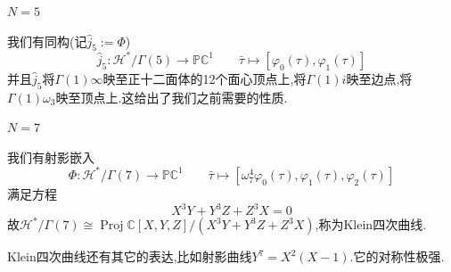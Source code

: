 \documentclass[pdf]{beamer}
\numberwithin{equation}{section}
\theoremstyle{plain}
\theoremstyle{plain}
\theoremstyle{remark}
\DeclareMathOperator{\Proj}{\operatorname{Proj}}
\begin{document}
\begin{frame}{$N=5$}

	我们有同构(记$\hat{j}_5:=\varPhi$)
	$$\hat{j}_5: \mathcal{H}^*/\Gamma(5) \longrightarrow \mathbb{PC}^{1} \qquad \bar{\tau} \longmapsto \left[ \varphi_0(\tau),\varphi_{1}(\tau) \right]$$
并且$\hat{j}_5$将$\Gamma(1)\infty$映至正十二面体的12个面心顶点上,将$\Gamma(1)i$映至边点,将$\Gamma(1)\omega_3$映至顶点上.这给出了我们之前需要的性质.
\end{frame}
\begin{frame}{$N=7$}

	我们有射影嵌入
	$$\varPhi: \mathcal{H}^*/\Gamma(7) \longrightarrow \mathbb{PC}^{1} \qquad \bar{\tau} \longmapsto \left[ \omega_7^4\varphi_0(\tau),\varphi_{1}(\tau),\varphi_{2}(\tau) \right]$$
	满足方程
	$$X^3Y+Y^3Z+Z^3X=0$$
	故$\mathcal{H}^*/\Gamma(7) \cong \Proj\mathbb{C}[X,Y,Z]/(X^3Y+Y^3Z+Z^3X)$,称为Klein四次曲线.
	
	Klein四次曲线还有其它的表达,比如射影曲线$Y^7=X^2(X-1)$.它的对称性极强.
	
	\vspace{.5cm}\hspace{-2em}
	\hyperlink{thereturn}{}
\end{frame}
\end{document}
